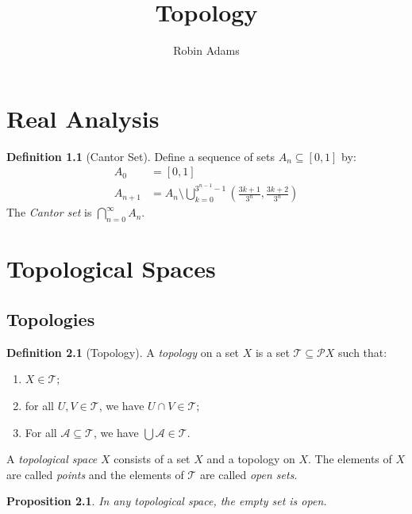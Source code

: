 \documentclass{report}
\title{Topology}
\author{Robin Adams}
\newtheorem{prop}[lm]{Proposition}
\theoremstyle{definition}
\newtheorem{df}[lm]{Definition}
\begin{document}
  \maketitle
  \tableofcontents



  \chapter{Real Analysis}

  \begin{df}[Cantor Set]
    Define a sequence of sets $A_n \subseteq [0, 1]$ by:
    \begin{align*}
      A_0 & = [0,1] \\
      A_{n+1} & = A_n \setminus \bigcup_{k=0}^{3^{n-1} - 1}
      \left( \frac{3k+1}{3^n},     \frac{3k+2}{3^n} \right)
    \end{align*}
    The \emph{Cantor set} is $\bigcap_{n=0}^\infty A_n$.
  \end{df}


  \chapter{Topological Spaces}

  \section{Topologies}

  \begin{df}[Topology]
    A \emph{topology} on a set $X$ is a set $\mathcal{T} \subseteq \mathcal{P}
    X$ such that:
    \begin{enumerate}
      \item $X \in \mathcal{T}$;
      \item for all $U, V \in \mathcal{T}$, we have $U \cap V \in \mathcal{T}$;
      \item For all $\mathcal{A} \subseteq \mathcal{T}$, we have $\bigcup
      \mathcal{A} \in \mathcal{T}$.
    \end{enumerate}
    A \emph{topological space} $X$ consists of a set $X$ and a topology on $X$.
    The elements of $X$ are called \emph{points} and the elements of
    $\mathcal{T}$ are called \emph{open sets}.
  \end{df}

  \begin{prop}
    \label{prop:topology:topological_space:emptyset}
    In any topological space, the empty set is open.
  \end{prop}
\end{document}

